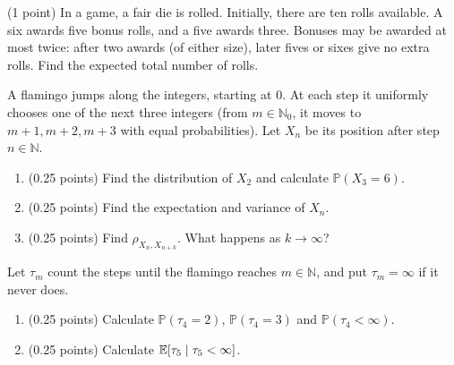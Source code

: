 \documentclass[a4paper]{report}
\begin{document}
\begin{problem} (1 point)
    In a game, a fair die is rolled. Initially, there are ten rolls available. A six awards five bonus rolls, and a five awards three. Bonuses may be awarded at most twice: after two awards (of either size), later fives or sixes give no extra rolls. Find the expected total number of rolls.
\end{problem}


\begin{problem}
A flamingo jumps along the integers, starting at 0. At each step it uniformly chooses one of the next three integers (from $m\in\mathbb N_0$, it moves to $m+1,m+2,m+3$ with equal probabilities). Let $X_n$ be its position after step $n\in\mathbb N$.
\begin{enumerate}
    \item (0.25 points) Find the distribution of $X_2$ and calculate $\mathbb P(X_3=6)$.
    \item (0.25 points) Find the expectation and variance of $X_n$.
    \item (0.25 points) Find $\rho_{X_n,X_{n+k}}$. What happens as $k\to\infty$?
\end{enumerate}
Let $\tau_m$ count the steps until the flamingo reaches $m\in\mathbb N$, and put $\tau_m=\infty$ if it never does.
\begin{enumerate}
    \item[4.] (0.25 points) Calculate $\mathbb P(\tau_4=2)$, $\mathbb P(\tau_4=3)$ and $\mathbb P(\tau_4<\infty)$.
    \item[5.] (0.25 points) Calculate $\mathbb {E}[\tau_5\mid\tau_5<\infty]$.
\end{enumerate}











\end{problem}
\end{document}
